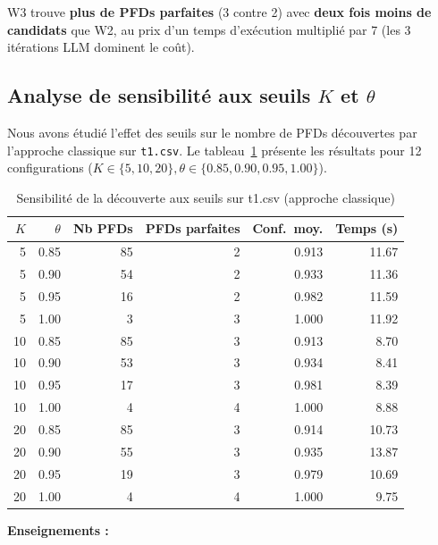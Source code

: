 \documentclass[12pt,a4paper]{article}
\begin{document}
W3 trouve \textbf{plus de PFDs parfaites} (3 contre 2) avec \textbf{deux fois moins de candidats} que W2, au prix d'un temps d'ex\'{e}cution multipli\'{e} par 7 (les 3 it\'{e}rations LLM dominent le co\^{u}t).

\subsection{Analyse de sensibilit\'{e} aux seuils $K$ et $\theta$}
\label{subsec:sensitivity}

Nous avons \'{e}tudi\'{e} l'effet des seuils sur le nombre de PFDs d\'{e}couvertes par l'approche classique sur \texttt{t1.csv}. Le tableau~\ref{tab:sensitivity} pr\'{e}sente les r\'{e}sultats pour 12 configurations ($K \in \{5, 10, 20\}, \theta \in \{0.85, 0.90, 0.95, 1.00\}$).

\begin{table}[H]
\centering
\caption{Sensibilit\'{e} de la d\'{e}couverte aux seuils sur t1.csv (approche classique)}
\label{tab:sensitivity}
\small
\begin{tabular}{@{}rrrrrr@{}}
\toprule
$K$ & $\theta$ & \textbf{Nb PFDs} & \textbf{PFDs parfaites} & \textbf{Conf.\ moy.} & \textbf{Temps (s)} \\
\midrule
5  & 0.85 & 85 & 2 & 0.913 & 11.67 \\
5  & 0.90 & 54 & 2 & 0.933 & 11.36 \\
5  & 0.95 & 16 & 2 & 0.982 & 11.59 \\
5  & 1.00 & 3  & 3 & 1.000 & 11.92 \\
\midrule
10 & 0.85 & 85 & 3 & 0.913 & 8.70 \\
10 & 0.90 & 53 & 3 & 0.934 & 8.41 \\
10 & 0.95 & 17 & 3 & 0.981 & 8.39 \\
10 & 1.00 & 4  & 4 & 1.000 & 8.88 \\
\midrule
20 & 0.85 & 85 & 3 & 0.914 & 10.73 \\
20 & 0.90 & 55 & 3 & 0.935 & 13.87 \\
20 & 0.95 & 19 & 3 & 0.979 & 10.69 \\
20 & 1.00 & 4  & 4 & 1.000 & 9.75 \\
\bottomrule
\end{tabular}
\end{table}

\textbf{Enseignements :}
\end{document}
